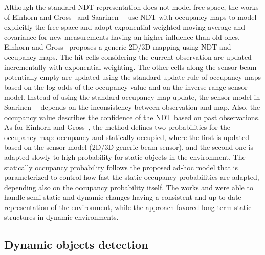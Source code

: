 Although the standard \gls{NDT} representation does not model free space, the works of Einhorn and Gross~\cite{einhorn-gross:2013:6698849,einhorn-gross:2015:008} and Saarinen~\etal~\cite{saarinen-et-al:2013:0278364913499415} use \gls{NDT} with occupancy maps to model explicitly the free space and adopt exponential weighted moving average and covariance for new measurements having an higher influence than old ones.
Einhorn and Gross~\cite{einhorn-gross:2015:008} proposes a generic 2D/3D mapping using \gls{NDT} and occupancy maps. The hit cells considering the current observation are updated incrementally with exponential weighting. The other cells along the sensor beam potentially empty are updated using the standard update rule of occupancy maps based on the log-odds of the occupancy value and on the inverse range sensor model.
Instead of using the standard occupancy map update, the sensor model in Saarinen~\etal~\cite{saarinen-et-al:2013:0278364913499415} depends on the inconsistency between observation and map. Also, the occupancy value describes the confidence of the \gls{NDT} based on past observations.
As for Einhorn and Gross~\cite{einhorn-gross:2015:008}, the method defines two probabilities for the occupancy map: occupancy and statically occupied, where the first is updated based on the sensor model (2D/3D generic beam sensor), and the second one is adapted slowly to high probability for static objects in the environment. The statically occupancy probability follows the proposed ad-hoc model that is parameterized to control how fast the static occupancy probabilities are adapted, depending also on the occupancy probability itself.
The works \cite{einhorn-gross:2013:6698849} and \cite{einhorn-gross:2015:008} were able to handle semi-static and dynamic changes having a consistent and up-to-date representation of the environment, while the approach \cite{saarinen-et-al:2013:0278364913499415} favored long-term static structures in dynamic environments.




\subsection{Dynamic objects detection}\label{sec:slam-dynamic:obj-detect}

